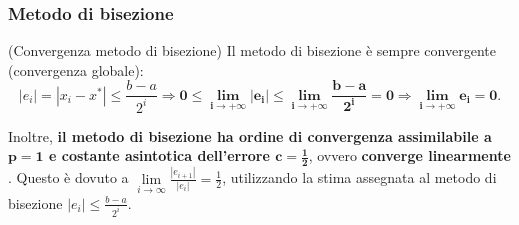 \subsubsection{Metodo di bisezione}\label{ssec:convergenza_metodo_bisezione}
\begin{remark}(Convergenza metodo di bisezione)
	Il metodo di bisezione è sempre convergente (convergenza globale): 
	\begin{equation*}
		|e_i|=|x_i-x^*|\leq \frac{b-a}{2^i}\Rightarrow \boldsymbol{0\leq \lim_{i\to + \infty}|e_i|\leq \lim_{i\to + \infty}{\frac{b-a}{2^i}=0}\Rightarrow \lim_{i\to + \infty}{e_i}=0.}
	\end{equation*}
\end{remark}

\noindent Inoltre, \textbf{il metodo di bisezione ha ordine di convergenza assimilabile a $\boldsymbol{p=1}$ e costante asintotica dell'errore $\boldsymbol{c=\frac{1}{2}}$}, ovvero \textbf{converge linearmente} \footnotemark. Questo è dovuto a $\underset{{i\to\infty}}{\lim}{\frac{|e_{i+1}|}{|e_i|}}=\frac{1}{2}$, utilizzando la stima assegnata al metodo di bisezione $|e_i|\leq\frac{b-a}{2^i}$.


